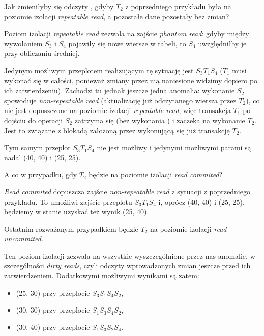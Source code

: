 \begin{example}
Jak zmieniłyby się odczyty , gdyby $T_2$ z poprzedniego przykładu była na poziomie izolacji \textit{repeatable read}, a pozostałe dane pozostały bez zmian?

Poziom izolacji \textit{repeatable read} zezwala na zajście \textit{phantom read}: gdyby między wywołaniem $S_3$ i $S_4$ pojawiły się nowe wiersze w tabeli, to $S_4$ uwzględniłby je przy obliczaniu średniej.

Jedynym możliwym przeplotem realizującym tę sytuację jest $S_3T_1S_4$ ($T_1$ musi wykonać się w całości, ponieważ zmiany przez nią naniesione widzimy dopiero po ich zatwierdzeniu). Zachodzi tu jednak jeszcze jedna anomalia: wykonanie $S_2$ spowoduje \textit{non-repeatable read} (aktualizację już odczytanego wiersza przez $T_2$), co nie jest dopuszczone na poziomie izolacji \textit{repeatable read}, więc transakcja $T_1$ po dojściu do operacji $S_2$ zatrzyma się (bez wykonania ) i zaczeka na wykonanie $T_2$. Jest to związane z blokadą założoną przez wykonującą się już transakcję $T_2$.

Tym samym przeplot $S_3T_1S_4$ nie jest możliwy i jedynymi możliwymi parami  są nadal (40, 40) i (25, 25).
\end{example}

\begin{example}
A co w przypadku, gdy $T_2$ będzie na poziomie izolacji \textit{read commited}?

\textit{Read commited} dopuszcza zajście \textit{non-repeatable read} z sytuacji z poprzedniego przykładu. To umożliwi zajście przeplotu $S_3T_1S_4$ i, oprócz (40, 40) i (25, 25), będziemy w stanie uzyskać też wynik (25, 40).
\end{example}

\begin{example}
Ostatnim rozważanym przypadkiem będzie $T_2$ na poziomie izolacji \textit{read uncommited}.

Ten poziom izolacji zezwala na wszystkie wyszczególnione przez nas anomalie, w szczególności \textit{dirty reads}, czyli odczyty wprowadzonych zmian jeszcze przed ich zatwierdzeniem. Dodatkowymi możliwymi wynikami  są zatem:
\begin{itemize}
    \item (25, 30) przy przeplocie $S_3S_1S_4S_2$,
    \item (30, 30) przy przeplocie $S_1S_3S_4S_2$,
    \item (30, 40) przy przeplocie $S_1S_3S_2S_4$.
\end{itemize}
\end{example}


